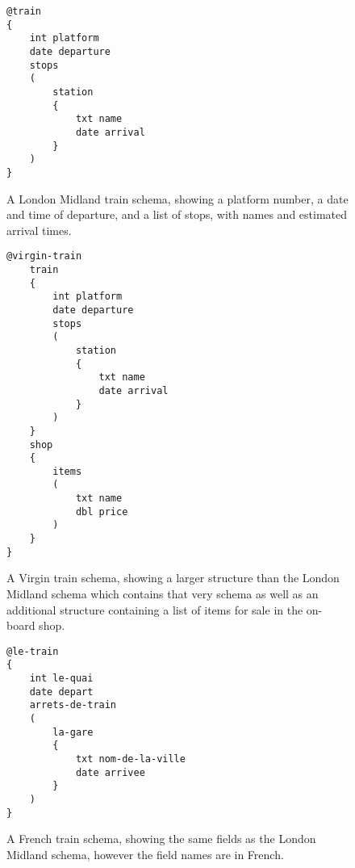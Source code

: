 \begin{figure}[h]
\begin{lstlisting}
@train
{
    int platform
    date departure
    stops
    (
    	station
    	{
    		txt name
    		date arrival
    	}
    )
}
\end{lstlisting}
\caption{A London Midland train schema, showing a platform number, a date and time of departure, and a list of stops, with names and estimated arrival times.}
\label{fig:londonmidlandtrain}
\end{figure}

\begin{figure}[h]
\begin{lstlisting}
@virgin-train
	train
	{
		int platform
		date departure
		stops
		(
			station
			{
				txt name
				date arrival
			}
		)
	}
	shop
	{
		items
		(
			txt name
			dbl price
		)
	}
}
\end{lstlisting}
\caption{A Virgin train schema, showing a larger structure than the London Midland schema which contains that very schema as well as an additional structure containing a list of items for sale in the on-board shop.}
\label{fig:virgintrain}
\end{figure}


\begin{figure}[h]
\begin{lstlisting}
@le-train
{
    int le-quai
    date depart
    arrets-de-train
    (
    	la-gare
    	{
    		txt nom-de-la-ville
    		date arrivee
    	}
    )
}
\end{lstlisting}
\caption{A French train schema, showing the same fields as the London Midland schema, however the field names are in French.}
\label{fig:frenchtrain}
\end{figure}

